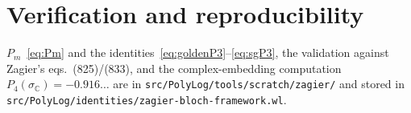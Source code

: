 \documentclass[11pt]{article}
\theoremstyle{plain}\newtheorem{theorem}{Theorem}\newtheorem{proposition}[theorem]{Proposition}
\theoremstyle{remark}\newtheorem{remark}[theorem]{Remark}
\begin{document}
\section*{Verification and reproducibility}
$P_m$~\eqref{eq:Pm} and the identities~\eqref{eq:goldenP3}--\eqref{eq:sgP3}, the validation against Zagier's
eqs.~(825)/(833), and the complex-embedding computation $P_4(\sigma_{\mathbb C})=-0.916\ldots$ are in
\texttt{src/PolyLog/tools/scratch/zagier/} and stored in
\texttt{src/PolyLog/identities/zagier-bloch-framework.wl}.
\end{document}
